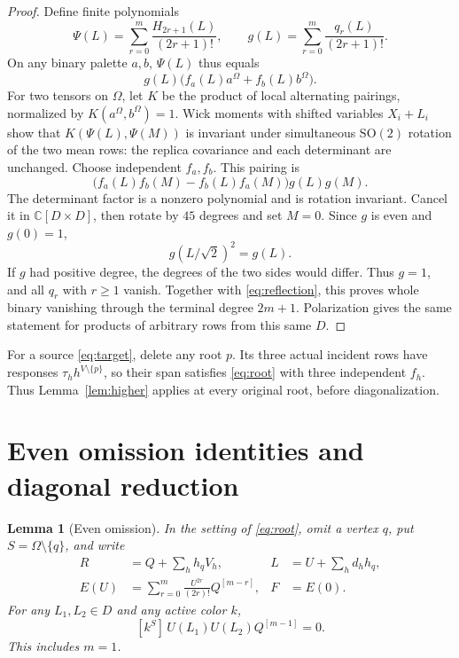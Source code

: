 \documentclass[11pt]{article}
\newtheorem{lemma}[theorem]{Lemma}
\numberwithin{equation}{section}
\begin{document}
\begin{proof}
Define finite polynomials
\[
 \Psi(L)=\sum_{r=0}^m\frac{H_{2r+1}(L)}{(2r+1)!},
 \qquad
 g(L)=\sum_{r=0}^m\frac{q_r(L)}{(2r+1)!}.
\]
On any binary palette \(a,b\), \(\Psi(L)\) thus equals
\[
 g(L)\bigl(f_a(L)a^\Omega+f_b(L)b^\Omega\bigr).
\]
For two tensors on \(\Omega\), let \(K\) be the product of local alternating
pairings, normalized by \(K(a^\Omega,b^\Omega)=1\). Wick moments with shifted
variables \(X_i+L_i\) show that \(K(\Psi(L),\Psi(M))\) is invariant under
simultaneous \(\mathrm{SO}(2)\) rotation of the two mean rows: the replica
covariance and each determinant are unchanged. Choose independent
\(f_a,f_b\). This pairing is
\[
 \bigl(f_a(L)f_b(M)-f_b(L)f_a(M)\bigr)g(L)g(M).
\]
The determinant factor is a nonzero polynomial and is rotation invariant.
Cancel it in \(\mathbb C[D\times D]\), then rotate by \(45\) degrees and set
\(M=0\). Since \(g\) is even and \(g(0)=1\),
\[
 g(L/\sqrt2)^2=g(L).
\]
If \(g\) had positive degree, the degrees of the two sides would differ.
Thus \(g=1\), and all \(q_r\) with \(r\ge1\) vanish. Together with
\eqref{eq:reflection}, this proves whole binary vanishing through the
terminal degree \(2m+1\). Polarization gives the same statement for products
of arbitrary rows from this same \(D\).
\end{proof}

For a source \eqref{eq:target}, delete any root \(p\). Its three actual
incident rows have responses \(\tau_hh^{V\setminus\{p\}}\), so their span
satisfies \eqref{eq:root} with three independent \(f_h\). Thus
Lemma~\ref{lem:higher} applies at every original root, before diagonalization.

\section{Even omission identities and diagonal reduction}\label{sec:diagonal}

\begin{lemma}[Even omission]\label{lem:omission}
In the setting of \eqref{eq:root}, omit a vertex \(q\), put
\(S=\Omega\setminus\{q\}\), and write
\[
 \begin{aligned}
 R&=Q+\sum_h h_q V_h,& L&=U+\sum_h d_hh_q,\\
 E(U)&=\sum_{r=0}^m\frac{U^{2r}}{(2r)!}Q^{[m-r]},&F&=E(0).
 \end{aligned}
\]
For any \(L_1,L_2\in D\) and any active color \(k\),
\[
 [k^S]\,U(L_1)U(L_2)Q^{[m-1]}=0.
\]
This includes \(m=1\).
\end{lemma}
\end{document}
